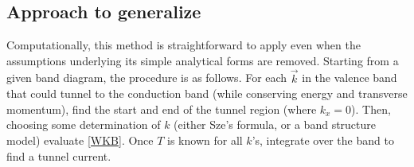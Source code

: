 \subsection{Approach to generalize}
Computationally, this method is straightforward to apply even when the assumptions underlying its simple analytical forms are removed.  Starting from a given band diagram, the procedure is as follows.  For each $\vec{k}$ in the valence band that could tunnel to the conduction band (while conserving energy and transverse momentum), find the start and end of the tunnel region (where $k_x=0$).  Then, choosing some determination of $k$ (either Sze's formula, or a band structure model) evaluate \ref{WKB}.  Once $T$ is known for all $k$'s, integrate over the band to find a tunnel current.